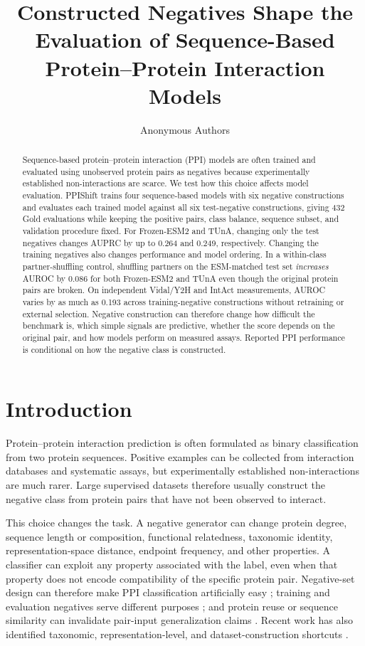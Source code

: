 \documentclass{article}
\title{Constructed Negatives Shape the Evaluation of Sequence-Based Protein--Protein Interaction Models}
\author{Anonymous Authors}
\begin{document}
\maketitle

\begin{abstract}
Sequence-based protein--protein interaction (PPI) models are often trained and
evaluated using unobserved protein pairs as negatives because experimentally
established non-interactions are scarce. We test how this choice affects model
evaluation. PPIShift trains four sequence-based models with six negative
constructions and evaluates each trained model against all six test-negative
constructions, giving 432 Gold evaluations while keeping the positive pairs,
class balance, sequence subset, and validation procedure fixed. For Frozen-ESM2
and TUnA, changing only the test negatives changes AUPRC by up to 0.264 and
0.249, respectively. Changing the training negatives also changes performance
and model ordering. In a within-class partner-shuffling control, shuffling
partners on the ESM-matched test set \emph{increases} AUROC by 0.086 for both
Frozen-ESM2 and TUnA even though the original protein pairs are broken. On
independent Vidal/Y2H and IntAct measurements, AUROC varies by as much as 0.193
across training-negative constructions without retraining or external
selection. Negative construction can therefore change how difficult the
benchmark is, which simple signals are predictive, whether the score depends on
the original pair, and how models perform on measured assays. Reported PPI
performance is conditional on how the negative class is constructed.
\end{abstract}

\section{Introduction}

Protein--protein interaction prediction is often formulated as binary
classification from two protein sequences. Positive examples can be collected
from interaction databases and systematic assays, but experimentally
established non-interactions are much rarer. Large supervised datasets
therefore usually construct the negative class from protein pairs that have not
been observed to interact.

This choice changes the task. A negative generator can change protein degree,
sequence length or composition, functional relatedness, taxonomic identity,
representation-space distance, endpoint frequency, and other properties. A
classifier can exploit any property associated with the label, even when that
property does not encode compatibility of the specific protein pair.
Negative-set design can therefore make PPI classification artificially easy
\citep{benhur2006}; training and evaluation negatives serve different purposes
\citep{park2011}; and protein reuse or sequence similarity can invalidate
pair-input generalization claims \citep{park2012,bernett2024}. Recent work has
also identified taxonomic, representation-level, and dataset-construction
shortcuts \citep{hallee2026,szymborski2026,bernett2026}.
\end{document}
